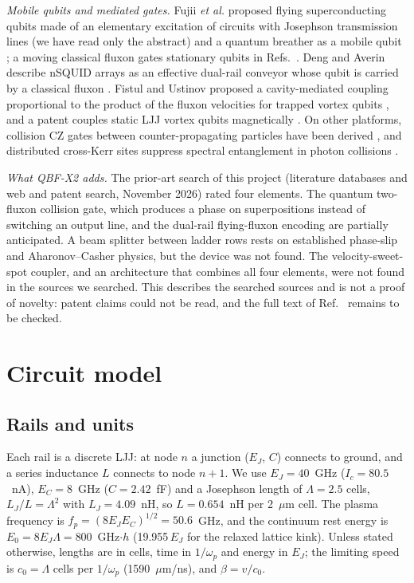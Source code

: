 \documentclass[10pt,twocolumn,letterpaper]{article}
\begin{document}
\emph{Mobile qubits and mediated gates.} Fujii \emph{et al.} proposed flying superconducting qubits made of an
elementary excitation of circuits with Josephson transmission lines \cite{Fujii2007} (we have read only the abstract)
and a quantum breather as a mobile qubit \cite{Fujii2008}; a moving classical fluxon gates stationary qubits in
Refs.~\cite{Matsuo2007,Fujii2009,Fujii2016}. Deng and Averin describe nSQUID arrays as an effective dual-rail conveyor
whose qubit is carried by a classical fluxon \cite{DengAverin2014}. Fistul and Ustinov proposed a cavity-mediated
coupling proportional to the product of the fluxon velocities for trapped vortex qubits \cite{FistulUstinov2003}, and
a patent couples static LJJ vortex qubits magnetically \cite{DWavePatent}. On other platforms, collision CZ gates
between counter-propagating particles have been derived \cite{BoseKorepin2011,Banchi2017}, and distributed cross-Kerr
sites suppress spectral entanglement in photon collisions \cite{BrodCombes2016}.

\emph{What QBF-X2 adds.} The prior-art search of this project (literature databases and web and patent search,
November 2026) rated four elements. The quantum two-fluxon collision gate, which produces a phase on superpositions
instead of switching an output line, and the dual-rail flying-fluxon encoding are partially anticipated. A beam
splitter between ladder rows rests on established phase-slip and Aharonov--Casher physics, but the device was not
found. The velocity-sweet-spot coupler, and an architecture that combines all four elements, were not found in the
sources we searched. This
describes the searched sources and is not a proof of novelty: patent claims could not be read, and the full text of
Ref.~\cite{Fujii2007} remains to be checked.

\section{Circuit model}
\label{sec:circuit}

\subsection{Rails and units}
Each rail is a discrete LJJ: at node $n$ a junction ($E_J$, $C$) connects to ground, and a series inductance $L$
connects to node $n+1$. We use $E_J=40$~GHz ($I_c=80.5$~nA), $E_C=8$~GHz ($C=2.42$~fF) and a Josephson length of
$\Lambda=2.5$ cells, $L_J/L=\Lambda^2$ with $L_J=4.09$~nH, so $L=0.654$~nH per 2~$\mu$m cell. The plasma frequency is
$f_p=(8E_JE_C)^{1/2}=50.6$~GHz, and the continuum rest energy is $E_0=8E_J\Lambda=800$~GHz$\cdot h$ (19.955\,$E_J$ for
the relaxed lattice kink). Unless stated otherwise, lengths are in cells, time in $1/\omega_p$ and energy in $E_J$; the
limiting speed is $c_0=\Lambda$ cells per $1/\omega_p$ (1590~$\mu$m/ns), and $\beta=v/c_0$.
\end{document}
